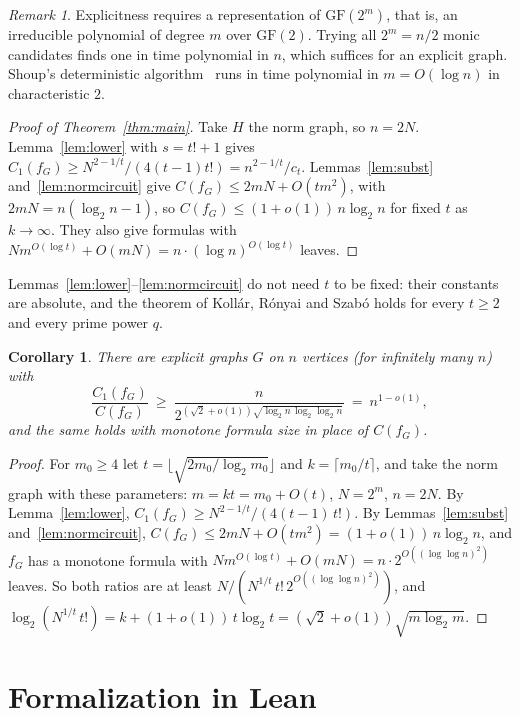 \documentclass[11pt]{article}
\newtheorem{corollary}[theorem]{Corollary}
\theoremstyle{definition}
\theoremstyle{remark}
\newtheorem{remark}[theorem]{Remark}
\newcommand{\GF}{\mathrm{GF}}
\newcommand{\Cone}{C_1}
\newcommand{\Csize}{C}
\begin{document}
\begin{remark}
Explicitness requires a representation of $\GF(2^m)$, that is, an irreducible polynomial of degree $m$ over $\GF(2)$.
Trying all $2^m=n/2$ monic candidates finds one in time polynomial in $n$, which suffices for an explicit graph. Shoup's
deterministic algorithm~\cite{Sho90} runs in time polynomial in $m=O(\log n)$ in characteristic $2$.
\end{remark}

\begin{proof}[Proof of Theorem~\ref{thm:main}]
Take $H$ the norm graph, so $n=2N$. Lemma~\ref{lem:lower} with $s=t!+1$ gives
$\Cone(f_G)\ge N^{2-1/t}/(4(t-1)t!)=n^{2-1/t}/c_t$. Lemmas~\ref{lem:subst}
and~\ref{lem:normcircuit} give $\Csize(f_G)\le 2mN+O(tm^2)$, with $2mN=n(\log_2 n-1)$, so
$\Csize(f_G)\le(1+o(1))\,n\log_2 n$ for fixed $t$ as $k\to\infty$. They also give formulas with
$N m^{O(\log t)}+O(mN)=n\cdot(\log n)^{O(\log t)}$ leaves.
\end{proof}

Lemmas~\ref{lem:lower}--\ref{lem:normcircuit} do not need $t$ to be fixed: their constants are absolute, and the
theorem of Koll\'ar, R\'onyai and Szab\'o holds for every $t\ge 2$ and every prime power $q$.

\begin{corollary}\label{cor:growing}
There are explicit graphs $G$ on $n$ vertices (for infinitely many $n$) with
\[
\frac{\Cone(f_G)}{\Csize(f_G)}\ \ge\ \frac{n}{2^{(\sqrt2+o(1))\sqrt{\log_2 n\,\log_2\log_2 n}}}\ =\ n^{1-o(1)},
\]
and the same holds with monotone formula size in place of $\Csize(f_G)$.
\end{corollary}

\begin{proof}
For $m_0\ge 4$ let $t=\lfloor\sqrt{2m_0/\log_2 m_0}\rfloor$ and $k=\lceil m_0/t\rceil$, and take
the norm graph with these parameters: $m=kt=m_0+O(t)$, $N=2^m$, $n=2N$. By Lemma~\ref{lem:lower},
$\Cone(f_G)\ge N^{2-1/t}/(4(t-1)\,t!)$. By Lemmas~\ref{lem:subst} and~\ref{lem:normcircuit},
$\Csize(f_G)\le 2mN+O(tm^2)=(1+o(1))\,n\log_2 n$, and $f_G$ has a monotone formula with
$Nm^{O(\log t)}+O(mN)=n\cdot 2^{O((\log\log n)^2)}$ leaves. So both ratios are at least
$N/(N^{1/t}\,t!\,2^{O((\log\log n)^2)})$, and $\log_2(N^{1/t}\,t!)=k+(1+o(1))\,t\log_2 t=(\sqrt2+o(1))\sqrt{m\log_2 m}$.
\end{proof}

\section{Formalization in Lean}\label{sec:lean}
\end{document}
